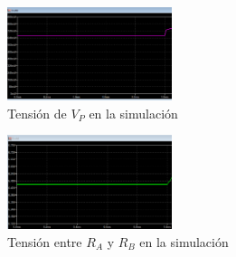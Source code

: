 \documentclass[letterpaper, 10 pt, conference]{ieeeconf}  %
\begin{document}
\begin{figure}[H]
  \centering
  \includegraphics[width=0.43\textwidth]{./imagenes/sim_vp.png}
  \caption{Tensión de $V_P$ en la simulación}
\end{figure}

\begin{figure}[H]
  \centering
  \includegraphics[width=0.43\textwidth]{./imagenes/sim_v_ra_rb.png}
  \caption{Tensión entre $R_A$ y $R_B$ en la simulación}
\end{figure}
\end{document}
